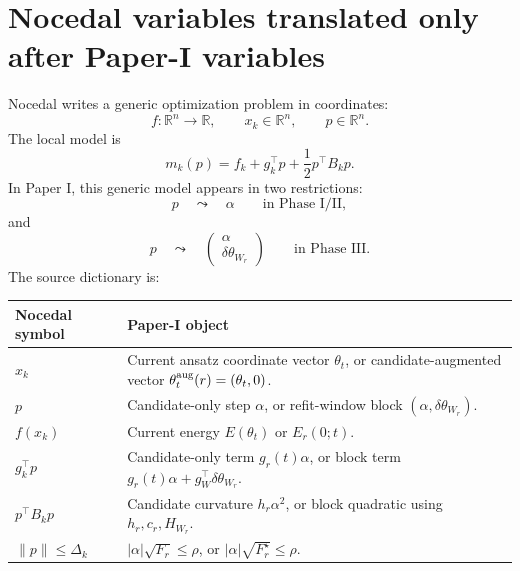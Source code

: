\documentclass[10pt,twocolumn]{article}
\newcommand{\R}{\mathbb R}
\begin{document}
\section{Nocedal variables translated only after Paper-I variables}

Nocedal writes a generic optimization problem in coordinates:
\begin{equation}
f:\R^n\to\R,\qquad x_k\in\R^n,\qquad p\in\R^n.
\label{eq:nocedal_generic}
\end{equation}
The local model is
\begin{equation}
m_k(p)=f_k+g_k^\top p+\frac12p^\top B_kp.
\label{eq:nocedal_model}
\end{equation}
In Paper I, this generic model appears in two restrictions:
\begin{equation}
p\quad\leadsto\quad \alpha
\qquad\text{in Phase I/II},
\label{eq:p_to_alpha}
\end{equation}
and
\begin{equation}
p\quad\leadsto\quad
\begin{pmatrix}
\alpha\\
\delta\theta_{W_r}
\end{pmatrix}
\qquad\text{in Phase III}.
\label{eq:p_to_block}
\end{equation}
The source dictionary is:
\begin{center}
\footnotesize
\begin{tabular}{>{\raggedright\arraybackslash}p{}
>{\raggedright\arraybackslash}p{}}
\toprule
Nocedal symbol & Paper-I object\\
\midrule
\(x_k\) & Current ansatz coordinate vector \(\theta_t\), or candidate-augmented vector \(\theta_t^{\rm aug}(r)=(\theta_t,0)\).\\
\(p\) & Candidate-only step \(\alpha\), or refit-window block \((\alpha,\delta\theta_{W_r})\).\\
\(f(x_k)\) & Current energy \(E(\theta_t)\) or \(E_r(0;t)\).\\
\(g_k^\top p\) & Candidate-only term \(g_r(t)\alpha\), or block term \(g_r(t)\alpha+g_W^\top\delta\theta_{W_r}\).\\
\(p^\top B_kp\) & Candidate curvature \(h_r\alpha^2\), or block quadratic using \(h_r,c_r,H_{W_r}\).\\
\(\|p\|\le\Delta_k\) & \(|\alpha|\sqrt{F_r}\le\rho\), or \(|\alpha|\sqrt{F_r^\star}\le\rho\).\\
\bottomrule
\end{tabular}
\end{center}
\end{document}
